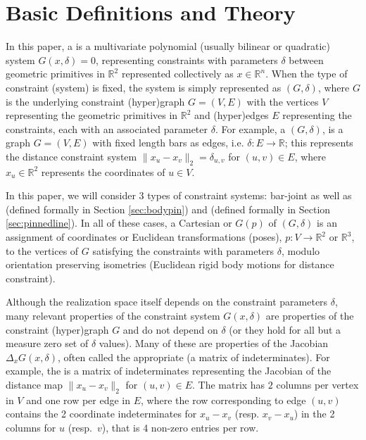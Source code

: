 \section{Basic Definitions and Theory}
\label{sec:appendix:defs}

In this paper, a  is a multivariate polynomial (usually bilinear or quadratic) system $G(x,\delta)=0$, representing constraints with parameters $\delta$ between geometric primitives  in $\mathbb{R}^2$ represented collectively as $x\in \mathbb{R}^n$.
%
When the type of constraint (system) is fixed, the system is simply represented as $(G,\delta)$, where $G$ is the underlying constraint (hyper)graph $G = (V,E)$ with the vertices $V$ representing the geometric primitives in $\mathbb{R}^2$ and (hyper)edges $E$ representing the constraints, each with an associated parameter $\delta$.
%
For example, a  $(G,\delta)$, is a graph $G=(V,E)$ with fixed length bars as edges, i.e. $\delta: E \rightarrow \mathbb{R}$; this represents the distance constraint system $\| x_u -x_v \|_2 = \delta_{u,v}$ for  $(u,v) \in E$, where $x_u \in \mathbb{R}^2$ represents the coordinates of $u\in V$.



In this paper, we will consider 3 types of constraint systems: bar-joint as well as  (defined formally in Section \ref{sec:bodypin}) and  (defined formally in Section \ref{sec:pinnedline}). In all of these cases, a Cartesian  or  $G(p)$ of $(G,\delta)$ is an assignment of coordinates or Euclidean transformations (poses), $p: V \rightarrow \mathbb{R}^2$ or $\mathbb{R}^3$, to the vertices of $G$ satisfying the constraints with parameters $\delta$, modulo orientation preserving isometries (Euclidean rigid body motions for distance constraint).

Although the realization space itself depends on the constraint parameters $\delta$, many relevant  properties of the constraint system $G(x,\delta)$ are properties of the constraint (hyper)graph $G$ and do not depend on $\delta$ (or they hold for all but a measure zero set of $\delta$ values). Many of these are properties of the Jacobian $\Delta_x G(x,\delta)$, often called the appropriate  (a matrix of indeterminates). For example, the  is a matrix of indeterminates representing the Jacobian of the distance map $\| x_u -x_v \|_2$  for $(u,v) \in E$. The matrix has $2$ columns per vertex in $V$ and one row per edge in $E$, where the row corresponding to edge $(u,v)$ contains the 2 coordinate indeterminates for $x_u -x_v$ (resp. $x_v-x_u$) in the 2 columns for $u$ (resp.\ $v$), that is 4 non-zero entries per row.


